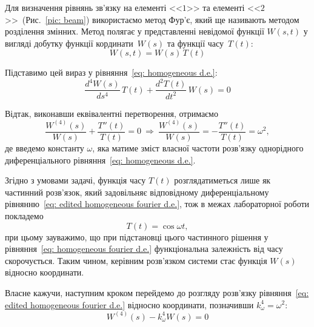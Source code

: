 \documentclass{mathreport}
\begin{document}
Для визначення рівнянь зв'язку на елементі <<$1$>> та елементі <<$2$>>~(Рис.~\ref{pic: beam}) використаємо метод Фур'є, який ще називають методом розділення змінних. Метод полягає у представленні невідомої функції $W(s,t)$ у вигляді добутку функції кординати~$W(s)$ та функції часу~$T(t):$ 
\begin{equation}\label{eq: fourier method}
    W(s,t) = W(s)\,T(t)
\end{equation}

Підставимо цей вираз у рівняння~\eqref{eq: homogeneous d.e.}:
\begin{equation}\label{eq: homogeneous fourier d.e.}
    \frac{d^4 W(s)}{d s^4}\,T(t) + \frac{d^2 T(t)}{d t^2}\,W(s) = 0
\end{equation}

Відтак, виконавши еквівалентні перетворення, отримаємо
\begin{equation}\label{eq: edited homogeneous fourier d.e.}
    \frac{W^{(4)}(s)}{W(s)} + \frac{T''(t)}{T(t)} = 0 \ \Longrightarrow \ \frac{W^{(4)}(s)}{W(s)} = - \frac{T''(t)}{T(t)} = \omega^2,
\end{equation}
де введемо константу $\omega$, яка матиме зміст власної частоти розв'язку однорідного диференціального рівняння~\eqref{eq: homogeneous d.e.}. 

Згідно з умовами задачі, функція часу $T(t)$ розглядатиметься лише як частинний розв'язок, який задовільняє відповідному диференціальному рівнянню~\eqref{eq: edited homogeneous fourier d.e.}, тож в межах лабораторної роботи покладемо
\begin{equation}\label{eq: T(t) assumption}
    T(t) = \cos{\omega t},
\end{equation}
при цьому зауважимо, що при підстановці цього частинного рішення у рівняння~\eqref{eq: homogeneous fourier d.e.} функціональна залежність від часу скорочується. Таким чином, керівним розв'язком системи стає функція $W(s)$ відносно координати. 

Власне кажучи, наступним кроком перейдемо до розгляду розв'язку рівняння~\eqref{eq: edited homogeneous fourier d.e.} відносно координати, позначивши $k_{\omega}^4=\omega^2:$
\begin{equation}\label{eq: W(s) homogeneous fourier d.e.}
    W^{(4)}(s) - k_{\omega}^4 W(s) = 0
\end{equation}
\end{document}
